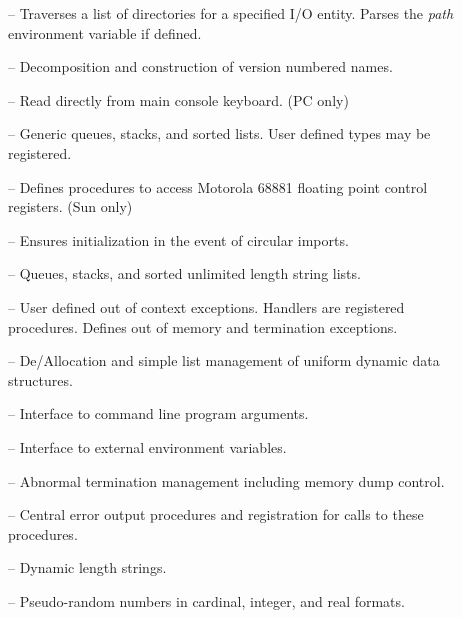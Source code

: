 \begin{description}
\item[] --
    Traverses a list of directories for a specified I/O entity.
    Parses the {\em path} environment variable if defined.

\item[] --
    Decomposition and construction of version numbered names.
    
\item[] --
    Read directly from main console keyboard. (PC only)
    
\item[] --
    Generic queues, stacks, and sorted lists.  User defined types
    may be registered.
    
\item[] --
    Defines procedures to access Motorola 68881 floating point control
    registers. (Sun only)

\item[] --
    Ensures initialization in the event of circular imports.
    
\item[] --
    Queues, stacks, and sorted unlimited length string lists.
    
\item[] --
    User defined out of context exceptions.  Handlers are registered
    procedures.  Defines out of memory and termination exceptions.

\item[] --
    De/Allocation and simple list management of uniform dynamic
    data structures.

\item[] --
    Interface to command line program arguments.
    
\item[] --
    Interface to external environment variables.

\item[] --
    Abnormal termination management including memory dump control.
    
\item[] --
    Central error output procedures and registration for calls
    to these procedures.

\item[] --
    Dynamic length strings.

\item[] --
    Pseudo-random numbers in cardinal, integer, and real formats.
    

\end{description}
